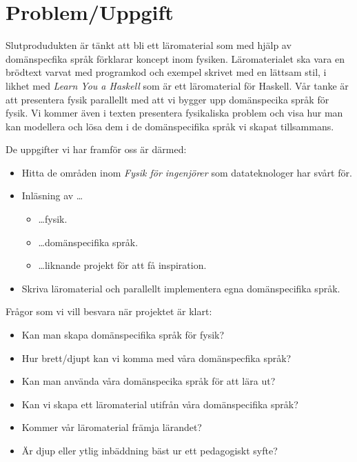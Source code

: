 \documentclass[12pt,a4paper]{article}
\begin{document}
\section{Problem/Uppgift}

Slutprodudukten är tänkt att bli ett läromaterial som med hjälp av domänspecfika språk förklarar koncept inom fysiken. Läromaterialet ska vara en brödtext varvat med programkod och exempel skrivet med en lättsam stil, i likhet med \textit{Learn You a Haskell}\cite{LYAH} som är ett läromaterial för Haskell. Vår tanke är att presentera fysik parallellt med att vi bygger upp domänspecika språk för fysik. Vi kommer även i texten presentera fysikaliska problem och visa hur man kan modellera och lösa dem i de domänspecifika språk vi skapat tillsammans.


De uppgifter vi har framför oss är därmed:

\begin{itemize}
	\item Hitta de områden inom \textit{Fysik för ingenjörer} som datateknologer har svårt för.
	\item Inläsning av \dots
	\begin{itemize}
		\item \dots fysik.
		\item \dots domänspecifika språk.
		\item \dots liknande projekt för att få inspiration.
	\end{itemize}
	\item Skriva läromaterial och parallellt implementera egna domänspecifika språk.
\end{itemize}


Frågor som vi vill besvara när projektet är klart:
\begin{itemize}
    \item Kan man skapa domänspecifika språk för fysik?
    \item Hur brett/djupt kan vi komma med våra domänspecfika språk?
    \item Kan man använda våra domänspecika språk för att lära ut?
    \item Kan vi skapa ett läromaterial utifrån våra domänspecifika språk?
    \item Kommer vår läromaterial främja lärandet?
    \item Är djup eller ytlig inbäddning bäst ur ett pedagogiskt syfte?
\end{itemize}
\end{document}
